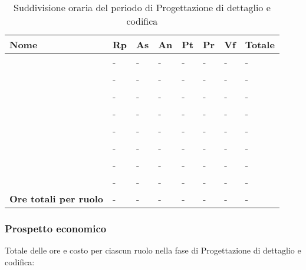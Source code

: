 		\begin{longtable}{ 
			>{\centering}p{} 
			>{\centering}p{}
			>{\centering}p{} 
			>{\centering}p{} 
			>{\centering}p{}
			>{\centering}p{} 
			>{\centering}p{}
			>{\centering\arraybackslash}p{} }
	
			\caption {Suddivisione oraria del periodo di Progettazione di dettaglio e codifica}		\\
			
			\textbf{\color{white}Nome} & 
			\textbf{\color{white}Rp} & 
			\textbf{\color{white}As} & 
			\textbf{\color{white}An} &
			\textbf{\color{white}Pt} &
			\textbf{\color{white}Pr} &
			\textbf{\color{white}Vf} &
			\textbf{\color{white}Totale}
			\tabularnewline  
			\endhead
			
			\VB & - & - & - & - & - & - & - \\
			\LB & - & - & - & - & - & - & - \\
			\NF & - & - & - & - & - & - & - \\
			\EG & - & - & - & - & - & - & - \\
			\FJ & - & - & - & - & - & - & - \\
			\MP & - & - & - & - & - & - & - \\
			\AS & - & - & - & - & - & - & - \\
			\AZ & - & - & - & - & - & - & - \\
			\textbf{Ore totali per ruolo} & - & - & - & - & - & - & - \\
		\end{longtable}
		
	\subsubsection{Prospetto economico}
		Totale delle ore e costo per ciascun ruolo nella fase di Progettazione di dettaglio e codifica:
		
